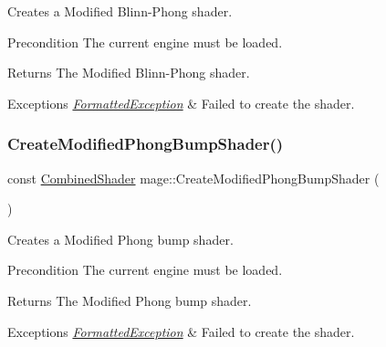 Creates a Modified Blinn-\/\+Phong shader.

\begin{DoxyPrecond}{Precondition}
The current engine must be loaded. 
\end{DoxyPrecond}
\begin{DoxyReturn}{Returns}
The Modified Blinn-\/\+Phong shader. 
\end{DoxyReturn}

\begin{DoxyExceptions}{Exceptions}
{\em \hyperlink{structmage_1_1_formatted_exception}{Formatted\+Exception}} & Failed to create the shader. \\
\hline
\end{DoxyExceptions}
\hypertarget{namespacemage_a49cc27a2c694cd43cb8fd06032b9519b}{}\label{namespacemage_a49cc27a2c694cd43cb8fd06032b9519b} 
\subsubsection{\texorpdfstring{Create\+Modified\+Phong\+Bump\+Shader()}{CreateModifiedPhongBumpShader()}}
{\footnotesize\ttfamily const \hyperlink{structmage_1_1_combined_shader}{Combined\+Shader} mage\+::\+Create\+Modified\+Phong\+Bump\+Shader (\begin{DoxyParamCaption}{ }\end{DoxyParamCaption})}

Creates a Modified Phong bump shader.

\begin{DoxyPrecond}{Precondition}
The current engine must be loaded. 
\end{DoxyPrecond}
\begin{DoxyReturn}{Returns}
The Modified Phong bump shader. 
\end{DoxyReturn}

\begin{DoxyExceptions}{Exceptions}
{\em \hyperlink{structmage_1_1_formatted_exception}{Formatted\+Exception}} & Failed to create the shader. \\
\hline
\end{DoxyExceptions}
\hypertarget{namespacemage_a142a17cae2aa125e33304ea3a78683f2}{}\label{namespacemage_a142a17cae2aa125e33304ea3a78683f2} 
